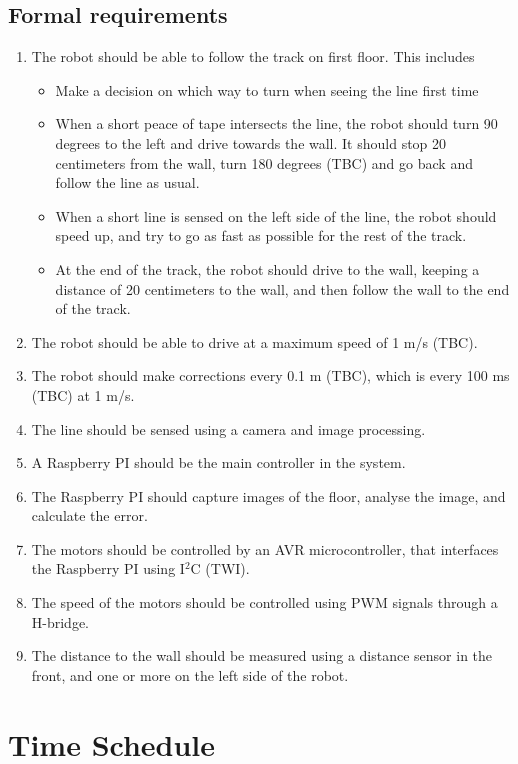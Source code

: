\subsection{Formal requirements}
\begin{enumerate}
	\item The robot should be able to follow the track on first floor. This includes 
	\begin{itemize}
		\item Make a decision on which way to turn when seeing the line first time
		\item When a short peace of tape intersects the line, the robot should turn 90 degrees to the left
		and drive towards the wall. It should stop 20 centimeters from the wall, turn 180 degrees
		(TBC) and go back and follow the line as usual.
		\item When a short line is sensed on the left side of the line, the robot should speed up, and try to go as fast as possible for the rest of the track.
		\item At the end of the track, the robot should drive to the wall, keeping a distance of 20
		centimeters to the wall, and then follow the wall to the end of the track.
	\end{itemize}
	\item The robot should be able to drive at a maximum speed of 1 m/s (TBC).
	\item The robot should make corrections every 0.1 m (TBC), which is every 100 ms (TBC) at 1 m/s.
	\item The line should be sensed using a camera and image processing.
	\item A Raspberry PI should be the main controller in the system.
	\item The Raspberry PI should capture images of the floor, analyse the image, and calculate the error.
	\item The motors should be controlled by an AVR microcontroller, that interfaces the Raspberry PI
	using I$^2$C (TWI).
	\item The speed of the motors should be controlled using PWM signals through a H-bridge.
	\item The distance to the wall should be measured using a distance sensor in the front, and one or more on the
	left side of the robot.
\end{enumerate}



\section{Time Schedule}

